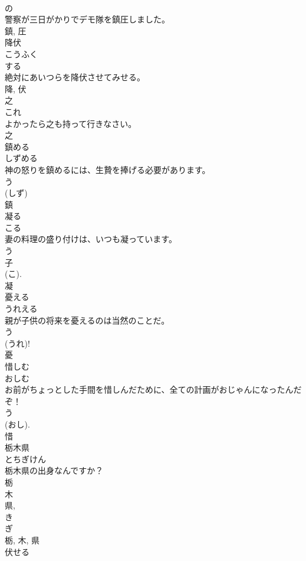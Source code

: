 \documentclass[8pt]{extreport}
\begin{document}
\begin{CJK}{UTF8}{min}
\\	の 
\\	警察が三日がかりでデモ隊を鎮圧しました。	
\\	鎮, 圧	
\\	降伏	
\\	こうふく	
\\	する 
\\	絶対にあいつらを降伏させてみせる。	
\\	降, 伏	
\\	之	
\\	これ	
\\	よかったら之も持って行きなさい。	
\\	之	
\\	鎮める	
\\	しずめる	
\\	神の怒りを鎮めるには、生贄を捧げる必要があります。	
\\	う 
\\	(しず) 
\\	鎮	
\\	凝る	
\\	こる	
\\	妻の料理の盛り付けは、いつも凝っています。	
\\	う 
\\	子
\\	(こ). 
\\	凝	
\\	憂える	
\\	うれえる	
\\	親が子供の将来を憂えるのは当然のことだ。	
\\	う 
\\	(うれ)! 
\\	憂	
\\	惜しむ	
\\	おしむ	
\\	お前がちょっとした手間を惜しんだために、全ての計画がおじゃんになったんだぞ！	
\\	う 
\\	(おし). 
\\	惜	
\\	栃木県	
\\	とちぎけん	
\\	栃木県の出身なんですか？	
\\	栃 
\\	木 
\\	県, 
\\	き 
\\	ぎ 
\\	栃, 木, 県	
\\	伏せる	

\end{CJK}
\end{document}
